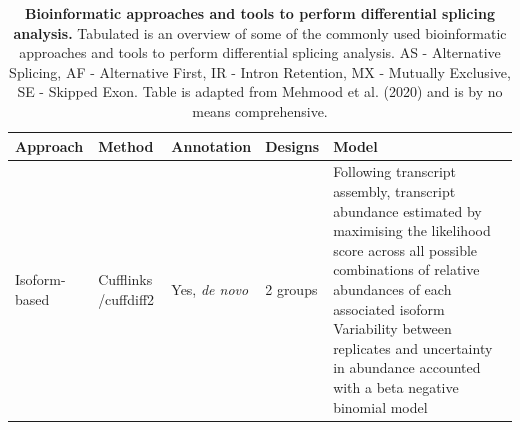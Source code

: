 \begin{landscape}
	\small %
	\setlength\tabcolsep{2pt} %
	\renewcommand{\arraystretch}{1}
\begin{longtable}[c]{p{2.5cm}p{2cm}p{2cm}p{2.5cm}p{17cm}}
	\caption[Bioinformatic approaches and tools to perform differential splicing analysis]%
	{\textbf{Bioinformatic approaches and tools to perform differential splicing analysis.} Tabulated is an overview of some of the commonly used bioinformatic approaches and tools to perform differential splicing analysis. \newline AS - Alternative Splicing, AF - Alternative First, IR - Intron Retention, MX - Mutually Exclusive, SE - Skipped Exon. Table is adapted from Mehmood et al. (2020)\cite{Mehmood2020} and is by no means comprehensive. }
	\label{tab: rnaseq_diffsplicing}\\
	\toprule
	Approach &
	Method &
	Annotation &
	Designs &
	Model \\ \midrule
	\multirow{2}{*}{Isoform-based} &
	Cufflinks \newline /cuffdiff2 &
	Yes, \textit{de novo} &
	2 groups &
	\tabitem Following transcript assembly, transcript abundance estimated by maximising the likelihood score across all possible combinations of relative abundances of each associated isoform \newline 
	\tabitem Variability between replicates and uncertainty in abundance accounted with a beta negative binomial model \\ 
	

\end{longtable}
\end{landscape}
